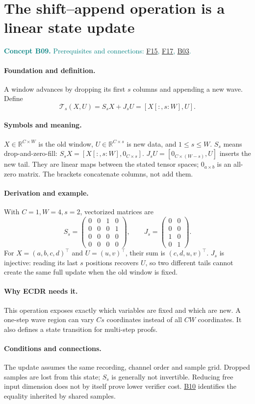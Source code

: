 \documentclass[11pt,a4paper]{article}
\newcommand{\R}{\mathbb R}
\newcommand{\conceptid}{Front matter}
\newcommand{\concept}[3]{\clearpage\renewcommand{\conceptid}{#1}%
\section{#2}\label{concept:#1}%
\textcolor{teal}{\textbf{Concept #1.} Prerequisites and connections: #3.}\par
\typeout{ECDR-CONCEPT-START #1 PAGE=\thepage}}
\begin{document}
\concept{B09}{The shift--append operation is a linear state update}{\hyperref[concept:F15]{F15}, \hyperref[concept:F17]{F17}, \hyperref[concept:B03]{B03}}
\paragraph{Foundation and definition.}
A window advances by dropping its first $s$ columns and appending a new
wave. Define
\[
 \mathcal T_s(X,U)=S_sX+J_sU=[X[:,s:W],U].
\]
\paragraph{Symbols and meaning.}
$X\in\R^{C\times W}$ is the old window, $U\in\R^{C\times s}$ is new
data, and $1\le s\le W$. $S_s$ means drop-and-zero-fill:
$S_sX=[X[:,s:W],0_{C\times s}]$.
$J_sU=[0_{C\times(W-s)},U]$ inserts the new tail. They are linear maps
between the stated tensor spaces; $0_{a\times b}$ is an all-zero matrix.
The brackets concatenate columns, not add them.
\paragraph{Derivation and example.}
With $C=1,W=4,s=2$, vectorized matrices are
\[
 S_s=\begin{pmatrix}0&0&1&0\\0&0&0&1\\0&0&0&0\\0&0&0&0\end{pmatrix},
 \qquad J_s=\begin{pmatrix}0&0\\0&0\\1&0\\0&1\end{pmatrix}.
\]
For $X=(a,b,c,d)^\top$ and $U=(u,v)^\top$, their sum is
$(c,d,u,v)^\top$. $J_s$ is injective: reading its last $s$ positions
recovers $U$, so two different tails cannot create the same full update
when the old window is fixed.
\paragraph{Why ECDR needs it.}
This operation exposes exactly which variables are fixed and which are
new. A one-step wave region can vary $Cs$ coordinates instead of all
$CW$ coordinates. It also defines a state transition for multi-step proofs.
\paragraph{Conditions and connections.}
The update assumes the same recording, channel order and sample grid.
Dropped samples are lost from this state; $S_s$ is generally not invertible.
Reducing free input dimension does not by itself prove lower verifier cost.
\hyperref[concept:B10]{B10} identifies the equality inherited by shared samples.
\par\label{endconcept:B09}
\end{document}
